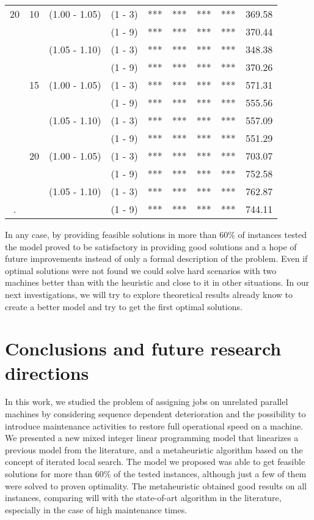 \documentclass[a4paper,11pt]{article}
\begin{document}
\begin{table}[!ht]
\begin{tabular}{|c|c|c|c|c|c|c |c|c|}
20 & 10 & (1.00 - 1.05) & (1 - 3) & 			*** &*** &*** &*** &  369.58 \\
   &    &  & (1 - 9) & 							*** &*** &*** &*** &  370.44 \\
   &    & (1.05 - 1.10) & (1 - 3) & 			*** &*** &*** &*** &  348.38 \\
   &    &  & (1 - 9) &						    *** &*** &*** &*** &  370.26 \\
   & 15 & (1.00 - 1.05) & (1 - 3) & 			*** &*** &*** &*** &  571.31 \\
   &    &  & (1 - 9) & 							*** &*** &*** &*** &  555.56 \\
   &    & (1.05 - 1.10) & (1 - 3) & 			*** &*** &*** &*** &  557.09 \\
   &    &  & (1 - 9) & 							*** &*** &*** &*** &  551.29 \\
   & 20 & (1.00 - 1.05) & (1 - 3) & 			*** &*** &*** &*** &  703.07 \\
   &    &  & (1 - 9) & 							*** &*** &*** &*** & 752.58 \\
   &    & (1.05 - 1.10) & (1 - 3) & 			*** &*** &*** &*** & 762.87 \\
 .  &    &  & (1 - 9) & 			***			 & *** &*** & *** & 744.11 \\


\hline

\end{tabular}
\end{table}

In any case, by providing feasible solutions in more than $60\%$ of instances tested the model proved to be satisfactory in providing good solutions and a hope of future improvements instead of only a formal description of the problem. Even if optimal solutions were not found we could solve hard scenarios with two machines better than with the heuristic and close to it in other situations. In our next investigations, we will try to explore theoretical results already know to create a better model and try to get the first optimal solutions. 
 

\section{Conclusions and future research directions}\label{sec:conclusions}%
%
In this work, we studied the problem of assigning jobs on unrelated parallel machines by considering sequence dependent deterioration and the possibility to introduce maintenance activities to restore full operational speed on a machine.  We presented a new mixed integer linear programming model that linearizes a previous model from the literature, and a metaheuristic algorithm based on the concept of iterated local search.
The model we proposed was able to get feasible solutions for more than $60\%$ of the tested instances, although just a few of them were solved to proven optimality. 
The metaheuristic obtained good results on all instances, comparing will with the state-of-art  algorithm in the literature, especially in the case of high maintenance times. 
\end{document}
